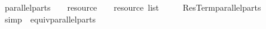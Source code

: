 \isamarkupfalse%
\ parallel{\isacharunderscore}parts\ {\isacharcolon}{\isacharcolon}\ {\isachardoublequoteopen}{\isacharparenleft}\ \ resource\ {\isasymRightarrow}\ {\isacharparenleft}\ \ resource\ list{\isachardoublequoteclose}\isanewline
\ \ \ \ \ ResTerm{\isachardot}parallel{\isacharunderscore}parts\isanewline
\ \ \isamarkupfalse%
\ {\isacharparenleft}simp\ \ equiv{\isacharunderscore}parallel{\isacharunderscore}parts{\isacharparenright}%
